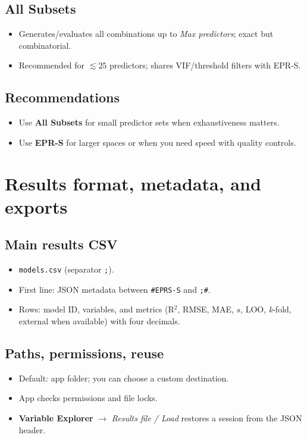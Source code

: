 \documentclass[12pt,a4paper]{article}
\begin{document}
\subsection{All Subsets}
\begin{itemize}
  \item Generates/evaluates all combinations up to \emph{Max predictors}; exact but combinatorial.
  \item Recommended for $\lesssim25$ predictors; shares VIF/threshold filters with EPR-S.
\end{itemize}

\subsection{Recommendations}
\begin{itemize}
  \item Use \textbf{All Subsets} for small predictor sets when exhaustiveness matters.
  \item Use \textbf{EPR-S} for larger spaces or when you need speed with quality controls.
\end{itemize}

\section{Results format, metadata, and exports}
\subsection{Main results CSV}
\begin{itemize}
  \item \texttt{models.csv} (separator \verb|;|).
  \item First line: JSON metadata between \verb|#EPRS-S| and \verb|;#|.
  \item Rows: model ID, variables, and metrics (R$^2$, RMSE, MAE, $s$, LOO, \emph{k}-fold, external when available) with four decimals.
\end{itemize}

\subsection{Paths, permissions, reuse}
\begin{itemize}
  \item Default: app folder; you can choose a custom destination.
  \item App checks permissions and file locks.
  \item \textbf{Variable Explorer} $\rightarrow$ \emph{Results file / Load} restores a session from the JSON header.
\end{itemize}
\end{document}
